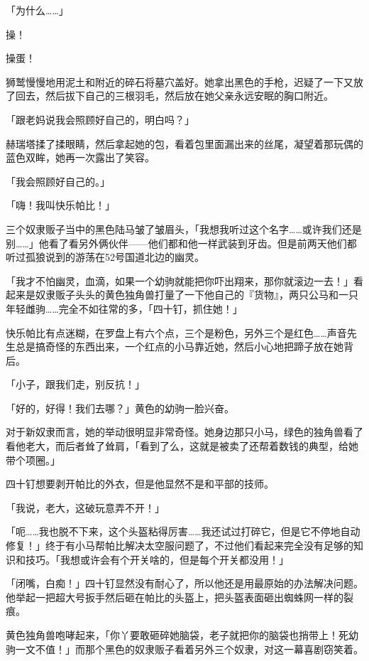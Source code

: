 「为什么……」

操！

操蛋！

狮鹫慢慢地用泥土和附近的碎石将墓穴盖好。她拿出黑色的手枪，迟疑了一下又放了回去，然后拔下自己的三根羽毛，然后放在她父亲永远安眠的胸口附近。

「跟老妈说我会照顾好自己的，明白吗？」

赫瑞塔揉了揉眼睛，然后拿起她的包，看着包里面漏出来的丝尾，凝望着那玩偶的蓝色双眸，她再一次露出了笑容。

「我会照顾好自己的。」

\horizonline


「嗨！我叫快乐帕比！」

三个奴隶贩子当中的黑色陆马皱了皱眉头，「我想我听过这个名字……或许我们还是别……」他看了看另外俩伙伴——他们都和他一样武装到牙齿。但是前两天他们都听过孤狼说到的游荡在52号国道北边的幽灵。

「我才不怕幽灵，血滴，如果一个幼驹就能把你吓出翔来，那你就滚边一去！」看起来是奴隶贩子头头的黄色独角兽打量了一下他自己的『货物』，两只公马和一只年轻雌驹……完全不如往常的多，「四十钉，抓住她！」

快乐帕比有点迷糊，在罗盘上有六个点，三个是粉色，另外三个是红色……声音先生总是搞奇怪的东西出来，一个红点的小马靠近她，然后小心地把蹄子放在她背后。

「小子，跟我们走，别反抗！」

「好的，好得！我们去哪？」黄色的幼驹一脸兴奋。

对于新奴隶而言，她的举动很明显非常奇怪。她身边那只小马，绿色的独角兽看了看他老大，而后者耸了耸肩，「看到了么，这就是被卖了还帮着数钱的典型，给她带个项圈。」

四十钉想要剥开帕比的外衣，但是他显然不是和平部的技师。

「我说，老大，这破玩意弄不开！」

「呃……我也脱不下来，这个头盔粘得厉害……我还试过打碎它，但是它不停地自动修复！」终于有小马帮帕比解决太空服问题了，不过他们看起来完全没有足够的知识和技巧。「我想或许会有个开关啥的，但是每个开关都没用！」

「闭嘴，白痴！」四十钉显然没有耐心了，所以他还是用最原始的办法解决问题。他举起一把超大号扳手然后砸在帕比的头盔上，把头盔表面砸出蜘蛛网一样的裂痕。

黄色独角兽咆哮起来，「你丫要敢砸碎她脑袋，老子就把你的脑袋也捎带上！死幼驹一文不值！」而那个黑色的奴隶贩子看着另外三个奴隶，对这一幕喜剧窃笑着。

